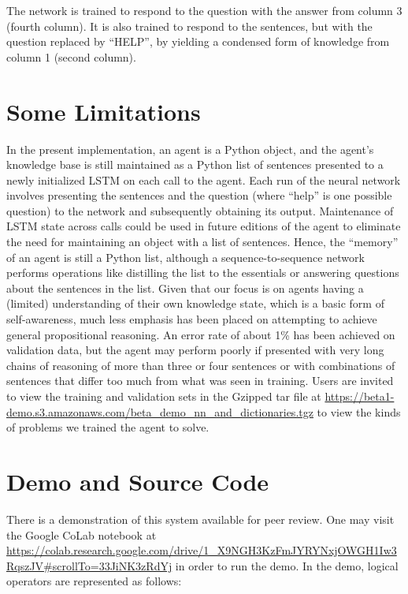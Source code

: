 \documentclass{article}
\begin{document}
The network is trained to respond to the question with the answer from column 3 (fourth column). It is also trained to respond to the sentences, but with the question replaced by “HELP”, by yielding a condensed form of knowledge from column 1 (second column).

\section{Some Limitations}

In the present implementation, an agent is a Python object, and the agent’s knowledge base is still maintained as a Python list of sentences presented to a newly initialized LSTM on each call to the agent. Each run of the neural network involves presenting the sentences and the question (where “help” is one possible question) to the network and subsequently obtaining its output. Maintenance of LSTM state across calls could be used in future editions of the agent to eliminate the need for maintaining an object with a list of sentences. Hence, the “memory” of an agent is still a Python list, although a sequence-to-sequence network performs operations like distilling the list to the essentials or answering questions about the sentences in the list.
Given that our focus is on agents having a (limited) understanding of their own knowledge state, which is a basic form of self-awareness, much less emphasis has been placed on attempting to achieve general propositional reasoning. An error rate of about 1\% has been achieved on validation data, but the agent may perform poorly if presented with very long chains of reasoning of more than three or four sentences or with combinations of sentences that differ too much from what was seen in training. Users are invited to view the training and validation sets in the Gzipped tar file at \url{https://beta1-demo.s3.amazonaws.com/beta_demo_nn_and_dictionaries.tgz} to view the kinds of problems we trained the agent to solve.

\section{Demo and Source Code}

There is a demonstration of this system available for peer review. One may visit the Google CoLab notebook at \url{https://colab.research.google.com/drive/1_X9NGH3KzFmJYRYNxjOWGH1Iw3RqszJV#scrollTo=33JiNK3zRdYj} in order to run the demo.
In the demo, logical operators are represented as follows:
\end{document}

